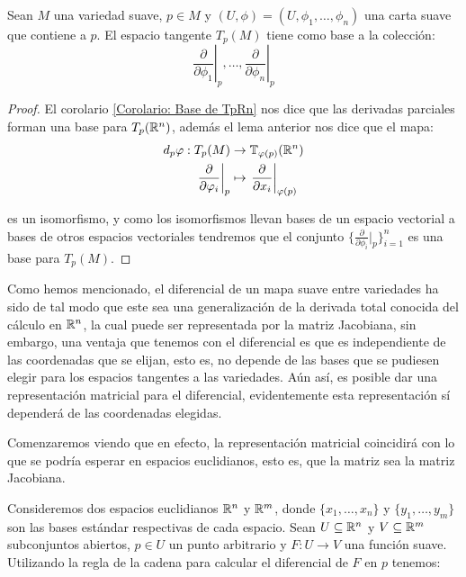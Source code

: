 \begin{theorem}
	Sean $M$ una variedad suave, $p \in M$ y $(U,\phi) = (U, \phi_1, \dots, \phi_n)$ una carta suave que contiene a $p$. El espacio tangente $T_p(M)$ tiene como base a la colección:
	\[
		\left. \frac{\partial}{\partial \phi_1} \right|_p, \hdots, \left. \frac{\partial}{\partial \phi_n} \right|_p
	\]
\end{theorem}

\begin{proof}
	El corolario \ref{Corolario: Base de TpRn} nos dice que las derivadas parciales forman una base para $T_p(\mathbb{R}^n)$, además el lema anterior nos dice que el mapa:
	\begin{align*}
		d_p\varphi: T_p(M)                                     & \to \mathbb{T}_{\varphi(p)} (\mathbb{R}^n)                                        \\
		\left. \frac{\partial}{\partial \varphi_i} \right|_{p} & \mapsto \left. \frac{\partial}{\partial x_i} \right|_{\varphi(p)}
	\end{align*}

	es un isomorfismo, y como los isomorfismos llevan bases de un espacio vectorial a bases de otros espacios vectoriales tendremos que el conjunto $\{ \frac{\partial}{\partial \phi_{i}}|_{p} \}_{i=1}^{n}$ es una base para $T_{p}(M)$.
\end{proof}

Como hemos mencionado, el diferencial de un mapa suave entre variedades ha sido de tal modo que este sea una generalización de la derivada total conocida del cálculo en $\mathbb{R}^n$, la cual puede ser representada por la matriz Jacobiana, sin embargo, una ventaja que tenemos con el diferencial es que es independiente de las coordenadas que se elijan, esto es, no depende de las bases que se pudiesen elegir para los espacios tangentes a las variedades. Aún así, es posible dar una representación matricial para el diferencial, evidentemente esta representación sí dependerá de las coordenadas elegidas.

Comenzaremos viendo que en efecto, la representación matricial coincidirá con lo que se podría esperar en espacios euclidianos, esto es, que la matriz sea la matriz Jacobiana.

Consideremos dos espacios euclidianos $\mathbb{R}^n$ y $\mathbb{R}^m$, donde $\{x_1, \dots, x_n\}$ y $\{y_1, \dots, y_m\}$ son las bases estándar respectivas de cada espacio. Sean $U \subseteq \mathbb{R}^n$ y $V \subseteq \mathbb{R}^m$ subconjuntos abiertos, $p \in U$ un punto arbitrario y $F: U \to V$ una función suave. Utilizando la regla de la cadena para calcular el diferencial de $F$ en $p$ tenemos:

